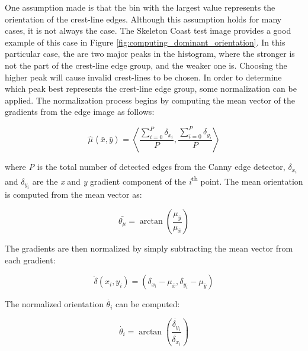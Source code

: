 One assumption made is that the bin with the largest value represents the orientation of the crest-line edges. Although this assumption holds for many cases, it is not always the case. The Skeleton Coast test image provides a good example of this case in Figure \ref{fig:computing_dominant_orientation}. In this particular case, the are two major peaks in the histogram, where the stronger is not the part of the crest-line edge group, and the weaker one is. Choosing the higher peak will cause invalid crest-lines to be chosen. In order to determine which peak best represents the crest-line edge group, some normalization can be applied. The normalization process begins by computing the mean vector of the gradients from the edge image as follows:
  
\begin{equation}
  \hat{\mu}\left\langle \bar{x},\bar{y}\right\rangle =\left\langle \frac{\sum_{i=0}^{P}\delta_{x_{i}}}{P},\frac{\sum_{i=0}^{P}\delta_{y_{i}}}{P}\right\rangle 
  \end{equation}
  
  where \emph{P} is the total number of detected edges from the Canny edge detector, $\delta_{x_{i}}$ and $\delta_{y_{i}}$ are the \emph{x} and \emph{y} gradient component of the \emph{i}\textsuperscript{th} point. The mean orientation is computed from the mean vector as:
  
  \begin{equation}
\bar{\theta_{\mu}}=\arctan\left(\frac{\mu_{\bar{y}}}{\mu_{\bar{x}}}\right)
  \end{equation}
  
  The gradients are then normalized by simply subtracting the mean vector from each gradient:
  
  \begin{equation}
\dot{\delta}\left(x_{i},y_{i}\right)=\left(\delta_{x_{i}}-\mu_{\bar{x}},\delta_{y_{i}}-\mu_{\bar{y}}\right)
  \end{equation}
  
  The normalized orientation $\dot{\theta_{i}}$ can be computed:
  
  \begin{equation}
  \dot{\theta_{i}}=\arctan\left(\frac{\dot{\delta_{y_{i}}}}{\dot{\delta_{x_{i}}}}\right)
  \end{equation}

